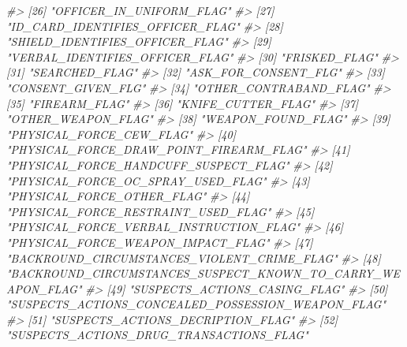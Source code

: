 \documentclass[
]{krantz}
\makeatletter
\newenvironment{Shaded}{\begin{snugshade}}{\end{snugshade}}
\newcommand{\CommentTok}[1]{\textcolor[rgb]{0.37,0.37,0.37}{\textit{#1}}}
\newenvironment{kframe}{%
\medskip{}
\setlength{\fboxsep}{.8em}
 \def\at@end@of@kframe{}%
 \ifinner\ifhmode%
  \def\at@end@of@kframe{\end{minipage}}%
  \begin{minipage}{\columnwidth}%
 \fi\fi%
 \def\FrameCommand##1{\hskip\@totalleftmargin \hskip-\fboxsep
 \colorbox{shadecolor}{##1}\hskip-\fboxsep
     \hskip-\linewidth \hskip-\@totalleftmargin \hskip\columnwidth}%
 \MakeFramed {\advance\hsize-\width
   \@totalleftmargin\z@ \linewidth\hsize
   \@setminipage}}%
 {\par\unskip\endMakeFramed%
 \at@end@of@kframe}
\renewenvironment{Shaded}{\begin{kframe}}{\end{kframe}}
\makeatother
\begin{document}
\begin{Shaded}
\begin{Highlighting}[]
\CommentTok{\#\textgreater{} [26] "OFFICER\_IN\_UNIFORM\_FLAG"                                   }
\CommentTok{\#\textgreater{} [27] "ID\_CARD\_IDENTIFIES\_OFFICER\_FLAG"                           }
\CommentTok{\#\textgreater{} [28] "SHIELD\_IDENTIFIES\_OFFICER\_FLAG"                            }
\CommentTok{\#\textgreater{} [29] "VERBAL\_IDENTIFIES\_OFFICER\_FLAG"                            }
\CommentTok{\#\textgreater{} [30] "FRISKED\_FLAG"                                              }
\CommentTok{\#\textgreater{} [31] "SEARCHED\_FLAG"                                             }
\CommentTok{\#\textgreater{} [32] "ASK\_FOR\_CONSENT\_FLG"                                       }
\CommentTok{\#\textgreater{} [33] "CONSENT\_GIVEN\_FLG"                                         }
\CommentTok{\#\textgreater{} [34] "OTHER\_CONTRABAND\_FLAG"                                     }
\CommentTok{\#\textgreater{} [35] "FIREARM\_FLAG"                                              }
\CommentTok{\#\textgreater{} [36] "KNIFE\_CUTTER\_FLAG"                                         }
\CommentTok{\#\textgreater{} [37] "OTHER\_WEAPON\_FLAG"                                         }
\CommentTok{\#\textgreater{} [38] "WEAPON\_FOUND\_FLAG"                                         }
\CommentTok{\#\textgreater{} [39] "PHYSICAL\_FORCE\_CEW\_FLAG"                                   }
\CommentTok{\#\textgreater{} [40] "PHYSICAL\_FORCE\_DRAW\_POINT\_FIREARM\_FLAG"                    }
\CommentTok{\#\textgreater{} [41] "PHYSICAL\_FORCE\_HANDCUFF\_SUSPECT\_FLAG"                      }
\CommentTok{\#\textgreater{} [42] "PHYSICAL\_FORCE\_OC\_SPRAY\_USED\_FLAG"                         }
\CommentTok{\#\textgreater{} [43] "PHYSICAL\_FORCE\_OTHER\_FLAG"                                 }
\CommentTok{\#\textgreater{} [44] "PHYSICAL\_FORCE\_RESTRAINT\_USED\_FLAG"                        }
\CommentTok{\#\textgreater{} [45] "PHYSICAL\_FORCE\_VERBAL\_INSTRUCTION\_FLAG"                    }
\CommentTok{\#\textgreater{} [46] "PHYSICAL\_FORCE\_WEAPON\_IMPACT\_FLAG"                         }
\CommentTok{\#\textgreater{} [47] "BACKROUND\_CIRCUMSTANCES\_VIOLENT\_CRIME\_FLAG"                }
\CommentTok{\#\textgreater{} [48] "BACKROUND\_CIRCUMSTANCES\_SUSPECT\_KNOWN\_TO\_CARRY\_WEAPON\_FLAG"}
\CommentTok{\#\textgreater{} [49] "SUSPECTS\_ACTIONS\_CASING\_FLAG"                              }
\CommentTok{\#\textgreater{} [50] "SUSPECTS\_ACTIONS\_CONCEALED\_POSSESSION\_WEAPON\_FLAG"         }
\CommentTok{\#\textgreater{} [51] "SUSPECTS\_ACTIONS\_DECRIPTION\_FLAG"                          }
\CommentTok{\#\textgreater{} [52] "SUSPECTS\_ACTIONS\_DRUG\_TRANSACTIONS\_FLAG"                   }

\end{Highlighting}
\end{Shaded}
\end{document}

